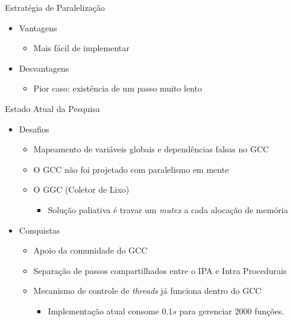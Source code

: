 \begin{frame}{Estratégia de Paralelização}
    \begin{itemize}
        \item Vantagens
            \begin{itemize}
                \item Mais fácil de implementar
            \end{itemize}
        \item Desvantagens
            \begin{itemize}
                \item Pior caso: existência de um passo muito lento
            \end{itemize}

    \end{itemize}
\end{frame}

\begin{frame}{Estado Atual da Pesquisa}
    \begin{itemize}
        \item Desafios
        \begin{itemize}
            \item Mapeamento de variáveis globais e dependências falsas no GCC
            \item O GCC não foi projetado com paralelismo em mente
            \item O GGC (Coletor de Lixo)
            \begin{itemize}
                \item Solução paliativa é travar um \textit{mutex} a cada alocação de memória
            \end{itemize}
        
        \end{itemize}

        \item Conquistas
        \begin{itemize}
            \item Apoio da comunidade do GCC
            \item Separação de passos compartilhados entre o IPA e Intra Procedurais
            \item Mecanismo de controle de \textit{threads} já funciona dentro do GCC
            \begin{itemize}
                \item Implementação atual consome $0.1s$ para gerenciar $2000$ funções.
            \end{itemize}
        \end{itemize}    
    \end{itemize}
\end{frame}

